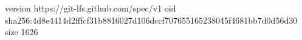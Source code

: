 version https://git-lfs.github.com/spec/v1
oid sha256:4d8e4414d2fffcf31b8816027d106dccf707655165238045f4681bb7d0d56d30
size 1626
